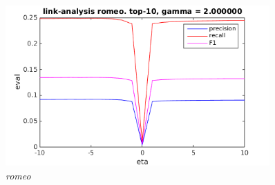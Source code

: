 \begin{figure}[h!]
  \centering
    \includegraphics[width=0.9\textwidth]{fig/link_eta/romeo_link_eta.png}
    \caption{\textit{romeo}}
    \vspace{-10pt}
\end{figure}

\FloatBarrier

